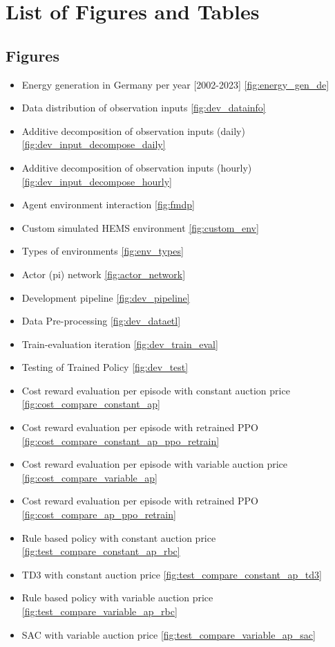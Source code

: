 \chapter*{List of Figures and Tables} \label{ch-7}  %
\begin{large}
\vspace*{3\baselineskip}

\section*{Figures}

\begin{itemize}
	\item Energy generation in Germany per year [2002-2023] \ref{fig:energy_gen_de}
	\item Data distribution of observation inputs \ref{fig:dev_datainfo}
	\item Additive decomposition of observation inputs (daily) \ref{fig:dev_input_decompose_daily}
	\item Additive decomposition of observation inputs (hourly) \ref{fig:dev_input_decompose_hourly}
	\item {Agent environment interaction} \ref{fig:fmdp}
	\item Custom simulated HEMS environment \ref{fig:custom_env}
	\item Types of environments \ref{fig:env_types}
	\item Actor (pi) network \ref{fig:actor_network}
	\item Development pipeline \ref{fig:dev_pipeline}
	\item Data Pre-processing \ref{fig:dev_dataetl}
	\item Train-evaluation iteration \ref{fig:dev_train_eval}
	\item Testing of Trained Policy \ref{fig:dev_test}
	\item Cost reward evaluation per episode with constant auction price \ref{fig:cost_compare_constant_ap}
	\item Cost reward evaluation per episode with retrained PPO \ref{fig:cost_compare_constant_ap_ppo_retrain}
	\item Cost reward evaluation per episode with variable auction price \ref{fig:cost_compare_variable_ap}
	\item Cost reward evaluation per episode with retrained PPO \ref{fig:cost_compare_ap_ppo_retrain}
	\item Rule based policy with constant auction price \ref{fig:test_compare_constant_ap_rbc}
	\item TD3 with constant auction price \ref{fig:test_compare_constant_ap_td3}
	\item Rule based policy with variable auction price
	\ref{fig:test_compare_variable_ap_rbc}
	\item SAC with variable auction price \ref{fig:test_compare_variable_ap_sac}
\end{itemize}


\end{large}
